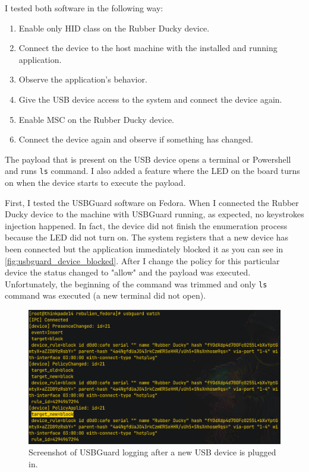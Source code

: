 I tested both software in the following way:
\begin{enumerate}
    \item Enable only HID class on the Rubber Ducky device.
    \item Connect the device to the host machine with the installed and running application.
    \item Observe the application's behavior.
    \item Give the USB device access to the system and connect the device again.
    \item Enable MSC on the Rubber Ducky device.
    \item Connect the device again and observe if something has changed.
\end{enumerate}
The payload that is present on the USB device opens a terminal or Powershell and runs \verb|ls| command. I also added a feature where the LED on the board turns on when the device starts to execute the payload.

First, I tested the USBGuard software on Fedora. When I connected the Rubber Ducky device to the machine with USBGuard running, as expected, no keystrokes injection happened. In fact, the device did not finish the enumeration process because the LED did not turn on. The system registers that a new device has been connected but the application immediately blocked it as you can see in \autoref{fig:usbguard_device_blocked}. After I change the policy for this particular device the status changed to "allow" and the payload was executed. Unfortunately, the beginning of the command was trimmed and only \verb|ls| command was executed (a new terminal did not open).

\begin{figure}[ht]
    \centering
    \includegraphics[width=\linewidth]{./obrazky-figures/usbguard_watch.png}
    \caption{Screenshot of USBGuard logging after a new USB device is plugged in.}
    \label{fig:usbguard_device_blocked}
\end{figure}

